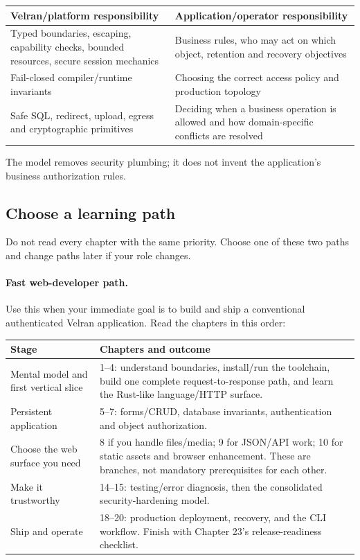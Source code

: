 \begin{center}
\begin{tabularx}{\textwidth}{@{}Y Y@{}}
\toprule
\textbf{Velran/platform responsibility} & \textbf{Application/operator responsibility} \\
\midrule
Typed boundaries, escaping, capability checks, bounded resources, secure session mechanics & Business rules, who may act on which object, retention and recovery objectives \\
Fail-closed compiler/runtime invariants & Choosing the correct access policy and production topology \\
Safe SQL, redirect, upload, egress and cryptographic primitives & Deciding when a business operation is allowed and how domain-specific conflicts are resolved \\
\bottomrule
\end{tabularx}
\end{center}

The model removes security plumbing; it does not invent the application's business authorization rules.

\subsection*{Choose a learning path}

Do not read every chapter with the same priority. Choose one of these two paths and change paths later if your role changes.

\paragraph{Fast web-developer path.}
Use this when your immediate goal is to build and ship a conventional authenticated Velran application. Read the chapters in this order:

\begin{center}
\begin{tabularx}{\textwidth}{@{}L{0.23\textwidth} Y@{}}
\toprule
\textbf{Stage} & \textbf{Chapters and outcome} \\
\midrule
Mental model and first vertical slice & 1--4: understand boundaries, install/run the toolchain, build one complete request-to-response path, and learn the Rust-like language/HTTP surface. \\
Persistent application & 5--7: forms/CRUD, database invariants, authentication and object authorization. \\
Choose the web surface you need & 8 if you handle files/media; 9 for JSON/API work; 10 for static assets and browser enhancement. These are branches, not mandatory prerequisites for each other. \\
Make it trustworthy & 14--15: testing/error diagnosis, then the consolidated security-hardening model. \\
Ship and operate & 18--20: production deployment, recovery, and the CLI workflow. Finish with Chapter 23's release-readiness checklist. \\
\bottomrule
\end{tabularx}
\end{center}

